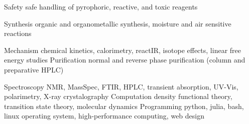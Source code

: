 

\begin{cvskills}
  \cvskill
  {Safety} %
  {safe handling of pyrophoric, reactive, and toxic reagents} %

  \cvskill
  {Synthesis} %
  {organic and organometallic synthesis, moisture and air sensitive reactions} %

  \cvskill
  {Mechanism} %
  {chemical kinetics, calorimetry, reactIR, isotope effects, linear free energy studies} %
  \cvskill
  {Purification} %
  {normal and reverse phase purification (column and preparative HPLC) } %

  \cvskill
  {Spectroscopy} %
  {NMR, MassSpec, FTIR, HPLC, transient absorption, UV-Vis, polarimetry, X-ray crystalography} %
  \cvskill
  {Computation} %
  {density functional theory, transition state theory, molecular dynamics} %
  \cvskill
  {Programming} %
  {python, julia, bash, linux operating system, high-performance computing, web design} %

\end{cvskills}
